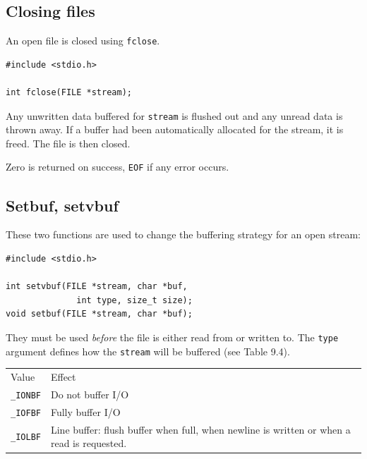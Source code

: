   

  \subsection{Closing files}
   

   An open file is closed using \texttt{fclose}.


   \begin{Verbatim}
#include <stdio.h>

int fclose(FILE *stream);
\end{Verbatim}

   Any unwritten data buffered for \texttt{stream} is  flushed  out  and
    any  unread  data  is  thrown  away.   If  a buffer had been
    automatically allocated for the stream, it  is  freed.   The
    file is then closed.


   Zero is returned on success, \texttt{EOF} if any error occurs.


  

  \subsection{Setbuf, setvbuf}
   

   These two functions are used to change the buffering strategy for an open
    stream:


   \begin{Verbatim}
#include <stdio.h>

int setvbuf(FILE *stream, char *buf,
              int type, size_t size);
void setbuf(FILE *stream, char *buf);
\end{Verbatim}

   They must be used \textit{before} the file is  either  read  from  or
    written  to.   The \texttt{type} argument defines how the
    \texttt{stream} will be buffered (see Table 9.4).


   \begin{tabular}{lp{\textwidth}}
     Value & Effect
    \\

     \texttt{\_IONBF} & Do not buffer I/O
    \\

     \texttt{\_IOFBF} & Fully buffer I/O
    \\

     \texttt{\_IOLBF} & Line buffer:  flush  buffer  when  full, when  newline  is written
      or when a read is requested.
    \\
\end{tabular}

